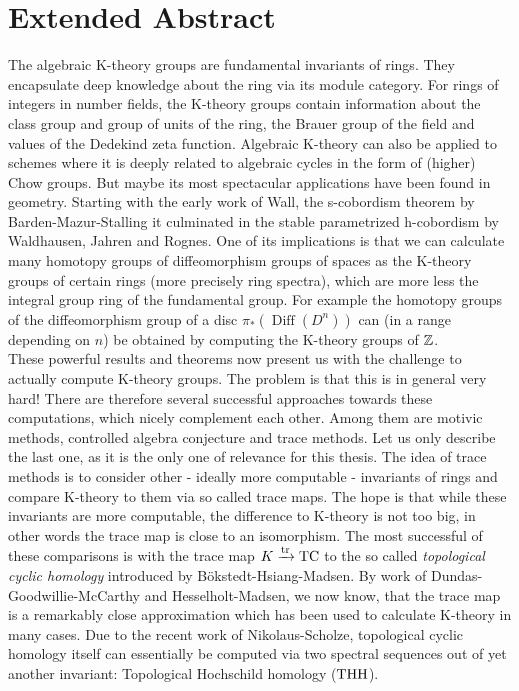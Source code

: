 \chapter*{Extended Abstract}

The algebraic K-theory groups are fundamental invariants of rings. 
They encapsulate deep knowledge about the ring via its module category.
For rings of integers in number fields, the K-theory groups contain information about the class group and group of units of the ring, the Brauer group of the field and values of the Dedekind zeta function.
Algebraic K-theory can also be applied to schemes where it is deeply related to algebraic cycles in the form of (higher) Chow groups.
But maybe its most spectacular applications have been found in geometry.
Starting with the early work of Wall, the s-cobordism theorem by Barden-Mazur-Stalling it culminated in the stable parametrized h-cobordism by Waldhausen, Jahren and Rognes.
One of its implications is that we can calculate many homotopy groups of diffeomorphism groups of spaces as the K-theory groups of certain rings (more precisely ring spectra), which are more less the integral group ring of the fundamental group.
For example the homotopy groups of the diffeomorphism group of a disc $\pi_* (\operatorname{Diff}(D^n))$ can (in a range depending on $n$) be obtained by computing the K-theory groups of $\mathbb{Z}$.
\\
These powerful results and theorems now present us with the challenge to actually compute K-theory groups. 
The problem is that this is in general very hard! 
There are therefore several successful approaches towards these computations, which nicely complement each other. Among them are motivic methods, controlled algebra conjecture and trace methods. 
Let us only describe the last one, as it is the only one of relevance for this thesis.
The idea of trace methods is to consider other - ideally more computable - invariants of rings and compare K-theory to them via so called trace maps. 
The hope is that while these invariants are more computable, the difference to K-theory is not too big, in other words the trace map is close to an isomorphism. 
The most successful of these comparisons is with the trace map $K\xrightarrow{\operatorname{tr}} \operatorname{TC}$ to the so called \textit{topological cyclic homology} introduced by Bökstedt-Hsiang-Madsen.
By work of Dundas-Goodwillie-McCarthy and Hesselholt-Madsen, we now know, that the trace map is a remarkably close approximation which has been used to calculate K-theory in many cases.
Due to the recent work of Nikolaus-Scholze, topological cyclic homology itself can essentially be computed via two spectral sequences out of yet another invariant: Topological Hochschild homology ($\operatorname{THH}$).

